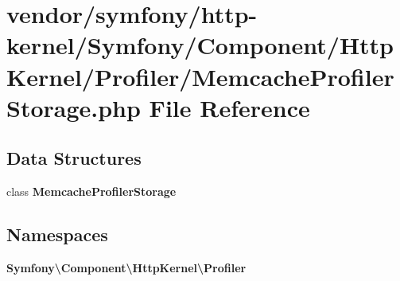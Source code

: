 \section{vendor/symfony/http-\/kernel/\+Symfony/\+Component/\+Http\+Kernel/\+Profiler/\+Memcache\+Profiler\+Storage.php File Reference}
\label{_memcache_profiler_storage_8php}
\subsection*{Data Structures}
\begin{DoxyCompactItemize}
\item 
class {\bf Memcache\+Profiler\+Storage}
\end{DoxyCompactItemize}
\subsection*{Namespaces}
\begin{DoxyCompactItemize}
\item 
 {\bf Symfony\textbackslash{}\+Component\textbackslash{}\+Http\+Kernel\textbackslash{}\+Profiler}
\end{DoxyCompactItemize}

